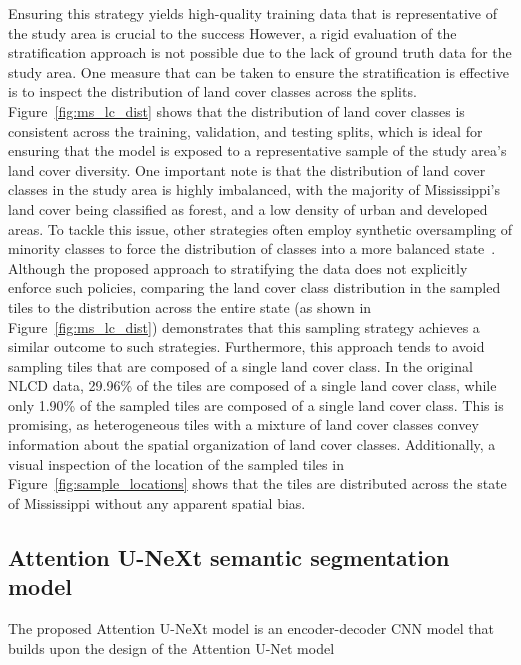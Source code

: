 Ensuring this strategy yields high-quality training data that is representative of the study area is crucial to the success 
However, a rigid evaluation of the stratification approach is not possible due to the lack of ground truth data for the study area.
One measure that can be taken to ensure the stratification is effective is to inspect the distribution of land cover classes across the splits.
Figure~\ref{fig:ms_lc_dist} shows that the distribution of land cover classes is consistent across the training, validation, and testing splits, which is ideal for ensuring that the model is exposed to a representative sample of the study area's land cover diversity.
One important note is that the distribution of land cover classes in the study area is highly imbalanced, with the majority of Mississippi's land cover being classified as forest, and a low density of urban and developed areas. 
To tackle this issue, other strategies often employ synthetic oversampling of minority classes to force the distribution of classes into a more balanced state~\cite{douzasImbalancedLearningLand2019, fonsecaImprovingImbalancedLand2021}.
Although the proposed approach to stratifying the data does not explicitly enforce such policies, comparing the land cover class distribution in the sampled tiles to the distribution across the entire state (as shown in Figure~\ref{fig:ms_lc_dist}) demonstrates that this sampling strategy achieves a similar outcome to such strategies.
Furthermore, this approach tends to avoid sampling tiles that are composed of a single land cover class. 
In the original NLCD data, 29.96\% of the tiles are composed of a single land cover class, while only 1.90\% of the sampled tiles are composed of a single land cover class.
This is promising, as heterogeneous tiles with a mixture of land cover classes convey information about the spatial organization of land cover classes.
Additionally, a visual inspection of the location of the sampled tiles in Figure~\ref{fig:sample_locations} shows that the tiles are distributed across the state of Mississippi without any apparent spatial bias.





\subsection{Attention U-NeXt semantic segmentation model}

The proposed Attention U-NeXt model is an encoder-decoder CNN model that builds upon the design of the Attention U-Net model~\cite{}